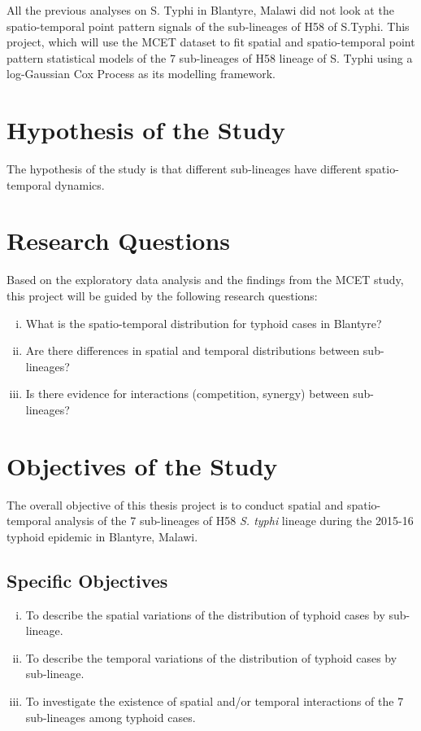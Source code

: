 All the previous analyses on S. Typhi in Blantyre, Malawi did not look at the spatio-temporal point pattern signals of the sub-lineages of H58 of S.Typhi. This project, which will use the MCET dataset to fit spatial and spatio-temporal point pattern statistical models of the 7 sub-lineages of H58 lineage of S. Typhi using a log-Gaussian Cox Process as its modelling framework.

\section{Hypothesis of the Study}

The hypothesis of the study is that different sub-lineages have different spatio-temporal dynamics.

\section{Research Questions}

Based on the exploratory data analysis and the findings from the MCET study, this project will be guided by the following research questions:

\begin{enumerate}[i.]
    \item What is the spatio-temporal distribution for typhoid cases in Blantyre?
    \item Are there differences in spatial and temporal distributions between sub-lineages?
    \item Is there evidence for interactions (competition, synergy) between sub-lineages?
\end{enumerate}

\section{Objectives of the Study}

The overall objective of this thesis project is to conduct spatial and spatio-temporal analysis of the 7 sub-lineages of H58 \textit{S. typhi} lineage during the 2015-16 typhoid epidemic in Blantyre, Malawi.

\subsection{Specific Objectives}

\begin{enumerate}[i.]
    \item To describe the spatial variations of the distribution of typhoid cases by sub-lineage.
    \item To describe the temporal variations of the distribution of typhoid cases by sub-lineage.
    \item To investigate the existence of spatial and/or temporal interactions of the 7 sub-lineages among typhoid cases.
\end{enumerate}

